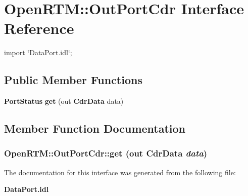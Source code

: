 \section{OpenRTM::OutPortCdr Interface Reference}
\label{interfaceOpenRTM_1_1OutPortCdr}


{\ttfamily import \char`\"{}DataPort.idl\char`\"{};}

\subsection*{Public Member Functions}
\begin{DoxyCompactItemize}
\item 
{\bf PortStatus} {\bf get} (out {\bf CdrData} data)
\end{DoxyCompactItemize}


\subsection{Member Function Documentation}
\subsubsection[{get}]{ OpenRTM::OutPortCdr::get (out {\bf CdrData} {\em data})}\label{interfaceOpenRTM_1_1OutPortCdr_a28570fbad908079a88059498845aa417}


The documentation for this interface was generated from the following file:\begin{DoxyCompactItemize}
\item 
{\bf DataPort.idl}\end{DoxyCompactItemize}
